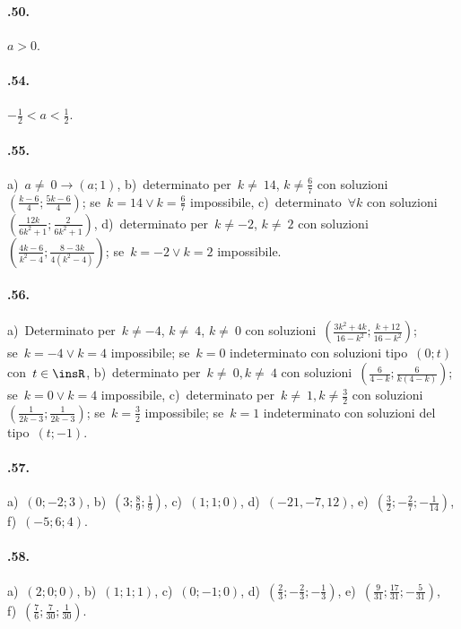 \begin{multicols}{2}
\paragraph{\thechapter.50.} $a>0$.

\paragraph{\thechapter.54.} $-\frac{1}{2}<a<\frac{1}{2}$.

\paragraph{\thechapter.55.} a)~$a\neq~0\rightarrow (a;1)$, b)~determinato per~$k\neq~14$, $k\neq \frac{6}{7}$ con soluzioni~$\left(\frac{k-6}{4}; \frac{5k-6}{4}\right)$;
se~$k=14\vee k=\frac{6}{7}$ impossibile, c)~determinato~$\forall k$ con soluzioni~$\left(\frac{12k}{6k^{2}+1};\frac{2}{6k^{2}+1}\right)$,
d)~determinato per~$k\neq -2$, $k\neq~2$ con soluzioni~$\left(\frac{4k-6}{k^{2}-4}; \frac{8-3k}{4(k^{2}-4)}\right)$; se~$k=-2 \vee k=2$ impossibile.

\paragraph{\thechapter.56.} a)~Determinato per~$k\neq -4$, $k\neq~4$, $k\neq~0$ con soluzioni~$\left(\frac{3k^{2}+4k}{16-k^{2}}; \frac{k+12}{16-k^{2}}\right)$;
\protect\\ se~$k=-4\vee k=4$ impossibile; se~$k=0$ indeterminato con soluzioni tipo~$(0;t)$ con~$t\in\insR$,
b)~determinato per~$k\neq~0, k\neq~4$ con soluzioni~$\left(\frac{6}{4-k}; \frac{6}{k(4-k)}\right)$;
se~$k=0\vee k=4$ impossibile, c)~determinato per~$k\neq~1, k\neq \frac{3}{2}$ con soluzioni~$\left(\frac{1}{2k-3}; \frac{1}{2k-3}\right)$;
se~$k=\frac{3}{2}$ impossibile; se~$k=1$ indeterminato con soluzioni del tipo~$(t;-1)$.

\paragraph{\thechapter.57.} a)~$(0; -2; 3)$, b)~$\left(3;\frac{8}{9};\frac{1}{9}\right)$, c)~$(1; 1;0)$, d)~$(-21, -7, 12)$,
e)~$\left(\frac{3}{2};-\frac{2}{7};-\frac{1}{14}\right)$, f)~$(-5; 6; 4)$.

\paragraph{\thechapter.58.} a)~$(2; 0; 0)$, b)~$(1; 1; 1)$, c)~$(0; -1; 0)$, d)~$\left(\frac{2}{3};-\frac{2}{3};-\frac{1}{3}\right)$,
e)~$\left(\frac{9}{31};\frac{17}{31};-\frac{5}{31}\right)$, f)~$\left(\frac{7}{6};\frac{7}{30};\frac{1}{30}\right)$.


\end{multicols}
